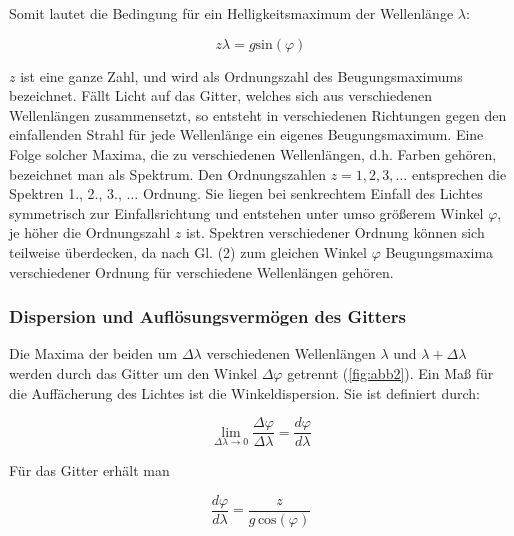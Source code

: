 \documentclass[11pt,ngerman]{scrartcl}
\begin{document}
Somit lautet die Bedingung für ein Helligkeitsmaximum der Wellenlänge $\lambda$:

\begin{equation}
	z \lambda = g \textrm{sin}(\varphi)
	\label{eq:gitterkonstante}
\end{equation}

$z$ ist eine ganze Zahl, und wird als Ordnungszahl des Beugungsmaximums bezeichnet. Fällt
Licht auf das Gitter, welches sich aus verschiedenen Wellenlängen zusammensetzt, so entsteht
in verschiedenen Richtungen gegen den einfallenden Strahl für jede Wellenlänge ein eigenes
Beugungsmaximum. Eine Folge solcher Maxima, die zu verschiedenen Wellenlängen, d.h. Farben
gehören, bezeichnet man als Spektrum. Den Ordnungszahlen $z = 1, 2, 3, \dots$ entsprechen die
Spektren 1., 2., 3., $\dots$ Ordnung. Sie liegen bei senkrechtem Einfall des Lichtes symmetrisch zur
Einfallsrichtung und entstehen unter umso größerem Winkel $\varphi$, je höher die Ordnungszahl $z$ ist.
Spektren verschiedener Ordnung können sich teilweise überdecken, da nach Gl. (2) zum gleichen
Winkel $\varphi$ Beugungsmaxima verschiedener Ordnung für verschiedene Wellenlängen gehören.

\subsubsection{Dispersion und Auflösungsvermögen des Gitters}

Die Maxima der beiden um $\Delta \lambda$ verschiedenen Wellenlängen $\lambda$ und $\lambda + \Delta \lambda$ werden durch das
Gitter um den Winkel $\Delta \varphi$ getrennt (\autoref{fig:abb2}). Ein Maß für die Auffächerung des Lichtes ist die
Winkeldispersion. Sie ist definiert durch:

\begin{equation}
	\lim_{\Delta \lambda \to 0}  \frac{\Delta \varphi}{\Delta \lambda}= \frac{d \varphi}{d \lambda}
\end{equation}

Für das Gitter erhält man

\begin{equation}
	\frac{d \varphi}{d \lambda} = \frac{z}{g \, \textrm{cos}(\varphi)}
\end{equation}
\end{document}
